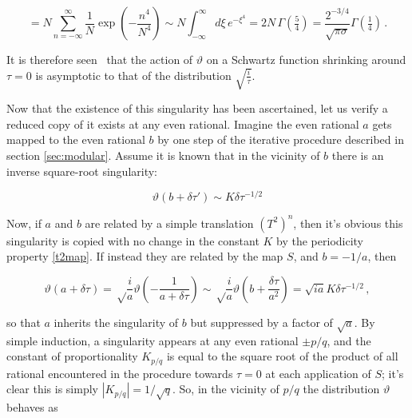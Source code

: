 \documentclass{article}
\newcommand{\intR}{\int_{-\infty}^\infty}
\newcommand{\sumZ}{\sum_{n=-\infty}^{\infty}}
\begin{document}
\begin{equation}
    = N \sumZ \frac{1}{N} \exp(-\frac{n^4}{N^4}) \sim N \intR d\xi \, e^{-\xi^4} = 2 N \, \Gamma(\tfrac{5}{4}) = \frac{2^{-3/4}}{\sqrt{\pi\sigma}} \Gamma(\tfrac{1}{4})\,.
\end{equation}

It is therefore seen%
\ that the action of $\vartheta$ on a Schwartz function shrinking around $\tau=0$ is asymptotic to that of the distribution $\sqrt{\frac{i}{\tau}}$.

Now that the existence of this singularity has been ascertained, let us verify a reduced copy of it exists at any even rational. Imagine the even rational $a$ gets mapped to the even rational $b$ by one step of the iterative procedure described in section \ref{sec:modular}. Assume it is known that in the vicinity of $b$ there is an inverse square-root singularity:

\begin{equation}
    \vartheta(b + \delta\tau') \sim K \delta \tau^{-1/2}
\end{equation}

Now, if $a$ and $b$ are related by a simple translation $(T^2)^n$, then it's obvious this singularity is copied with no change in the constant $K$ by the periodicity property \eqref{t2map}. If instead they are related by the map $S$, and $b = -1/a$, then

\begin{equation}
    \vartheta(a + \delta\tau) = \sqrt\frac{i}{a} \vartheta\left(-\frac{1}{a+\delta\tau}\right) \sim \sqrt\frac{i}{a} \vartheta(b + \frac{\delta \tau}{a^2}) = \sqrt{ia} K \delta\tau^{-1/2}\,,
\end{equation}

so that $a$ inherits the singularity of $b$ but suppressed by a factor of $\sqrt{a}$. By simple induction, a singularity appears at any even rational $\pm p/q$, and the constant of proportionality $K_{p/q}$ is equal to the square root of the product of all rational encountered in the procedure towards $\tau = 0$ at each application of $S$; it's clear this is simply $|K_{p/q}| = 1/\sqrt{q}$. So, in the vicinity of $p/q$ the distribution $\vartheta$ behaves as
\end{document}
